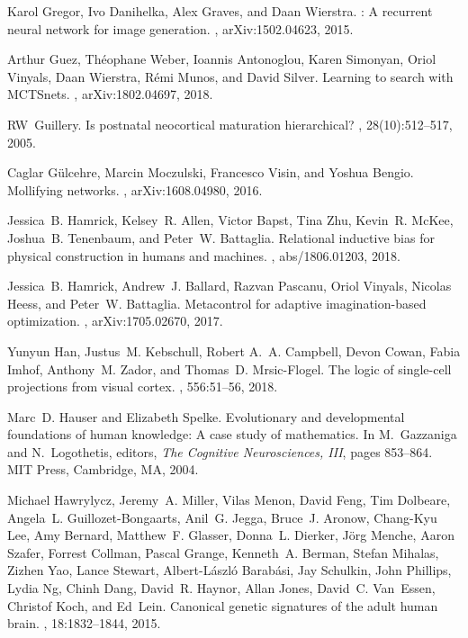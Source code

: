 \documentclass[letterpaper,11pt]{article}
\begin{document}
\begin{thebibliography}{100}
Karol Gregor, Ivo Danihelka, Alex Graves, and Daan Wierstra.
: A recurrent neural network for image generation.
, arXiv:1502.04623, 2015.

Arthur Guez, Th{\'{e}}ophane Weber, Ioannis Antonoglou, Karen Simonyan, Oriol
  Vinyals, Daan Wierstra, R{\'{e}}mi Munos, and David Silver.
\newblock Learning to search with {MCTS}nets.
, arXiv:1802.04697, 2018.

RW~Guillery.
\newblock Is postnatal neocortical maturation hierarchical?
, 28(10):512--517, 2005.

Caglar G\"{u}lcehre, Marcin Moczulski, Francesco Visin, and Yoshua Bengio.
\newblock Mollifying networks.
, arXiv:1608.04980, 2016.

Jessica~B. Hamrick, Kelsey~R. Allen, Victor Bapst, Tina Zhu, Kevin~R. McKee,
  Joshua~B. Tenenbaum, and Peter~W. Battaglia.
\newblock Relational inductive bias for physical construction in humans and
  machines.
, abs/1806.01203, 2018.

Jessica~B. Hamrick, Andrew~J. Ballard, Razvan Pascanu, Oriol Vinyals, Nicolas
  Heess, and Peter~W. Battaglia.
\newblock Metacontrol for adaptive imagination-based optimization.
, arXiv:1705.02670, 2017.

Yunyun Han, Justus~M. Kebschull, Robert A.~A. Campbell, Devon Cowan, Fabia
  Imhof, Anthony~M. Zador, and Thomas~D. Mrsic-Flogel.
\newblock The logic of single-cell projections from visual cortex.
, 556:51--56, 2018.

Marc~D. Hauser and Elizabeth Spelke.
\newblock Evolutionary and developmental foundations of human knowledge: A case
  study of mathematics.
\newblock In M.~Gazzaniga and N.~Logothetis, editors, {\em The Cognitive
  Neurosciences, {III}}, pages 853--864. MIT Press, Cambridge, MA, 2004.

Michael Hawrylycz, Jeremy~A. Miller, Vilas Menon, David Feng, Tim Dolbeare,
  Angela~L. Guillozet-Bongaarts, Anil~G. Jegga, Bruce~J. Aronow, Chang-Kyu Lee,
  Amy Bernard, Matthew~F. Glasser, Donna~L. Dierker, J\"{o}rg Menche, Aaron
  Szafer, Forrest Collman, Pascal Grange, Kenneth~A. Berman, Stefan Mihalas,
  Zizhen Yao, Lance Stewart, Albert-L\'{a}szl\'{o} Barab\'{a}si, Jay Schulkin,
  John Phillips, Lydia Ng, Chinh Dang, David~R. Haynor, Allan Jones, David~C.
  Van~Essen, Christof Koch, and Ed~Lein.
\newblock Canonical genetic signatures of the adult human brain.
, 18:1832--1844, 2015.


\end{thebibliography}
\end{document}
